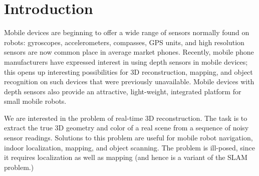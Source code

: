 \documentclass[conference,10pt]{IEEEtran}
\begin{document}
\section{Introduction}

Mobile devices are beginning to offer a wide range of sensors normally found on
robots: gyroscopes, accelerometers, compasses, GPS units, and high resolution
sensors are now common place in average market phones. Recently, mobile phone
manufacturers have expressed interest in using depth sensors in mobile devices;
this opens up interesting possibilities for 3D reconstruction, mapping,
and object recognition on such devices that were previously unavailable. Mobile
devices with depth sensors also provide an attractive, light-weight, integrated
platform for small mobile robots.

We are interested in the problem of real-time 3D reconstruction. The task is to
extract the true 3D geometry and color of a real scene from a sequence of noisy
sensor readings. Solutions to this problem are useful for mobile robot navigation,
indoor localization, mapping, and object scanning. The problem is ill-posed,
since it requires localization as well as mapping (and hence is a variant of
the SLAM problem.)
\end{document}
